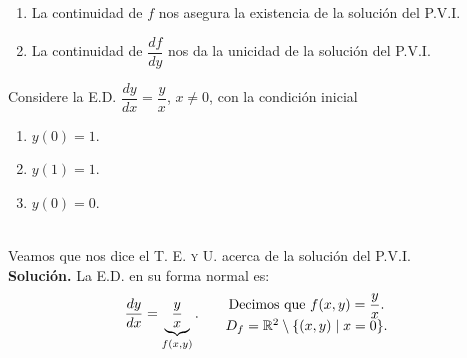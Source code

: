 \documentclass{beamer}
\begin{document}
\begin{frame}[t]
	\vspace{-3mm}
	\begin{block}{\vspace*{-3ex}}
		\begin{enumerate}
			\item La continuidad de \(f\) nos asegura la existencia de la solución del P.V.I.
			\item La continuidad de \(\dfrac{df}{dy}\) nos da la unicidad de la solución del P.V.I.
		\end{enumerate}
	\end{block}
	\begin{example}
		Considere la E.D. \(\dfrac{dy}{dx} = \dfrac{y}{x}\), \(x \ne 0\), con la condición inicial\\[1mm]
		\begin{minipage}{0.3\linewidth}
			\begin{enumerate}
				\item \(y(0) =1\).
			\end{enumerate}
		\end{minipage}\hspace{5mm}
		\begin{minipage}{0.3\linewidth}
			\begin{enumerate}
				\setcounter{enumi}{1}
				\item \(y(1) =1\).
			\end{enumerate}
		\end{minipage}
		\begin{minipage}{0.3\linewidth}
			\begin{enumerate}
				\setcounter{enumi}{2}
				\item \(y(0) =0\).
			\end{enumerate}
		\end{minipage} \\[2mm]
		Veamos que nos dice el \textsc{T. E. y U.} acerca de la solución del P.V.I. \\
		\textbf{Solución.} La E.D. en su forma normal es: \vspace{-3mm}
		\[
			\dfrac{dy}{dx} = \underbrace{\dfrac{y}{x}}_{f(x,y)}. \hspace{5mm} \begin{array}{c}
				\mbox{Decimos que } f(x,y) = \dfrac{y}{x}.\\[1mm]
				D_f = \mathbb{R} ^2 \setminus \{(x,y) \;|\; x=0\}.
			\end{array}
		\]
	\end{example}
\end{frame}
\end{document}
